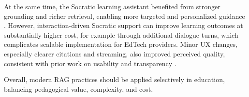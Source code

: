At the same time, the Socratic learning assistant benefited from stronger grounding and richer retrieval, enabling more targeted and personalized guidance \autocite{socaraticChatbot,Shetye2024Khanmigo}. However, interaction-driven Socratic support can improve learning outcomes at substantially higher cost, for example through additional dialogue turns, which complicates scalable implementation for EdTech providers. Minor UX changes, especially clearer citations and streaming, also improved perceived quality, consistent with prior work on usability and transparency \autocite{ZawackiRichter2019}. 

Overall, modern RAG practices should be applied selectively in education, balancing pedagogical value, complexity, and cost.